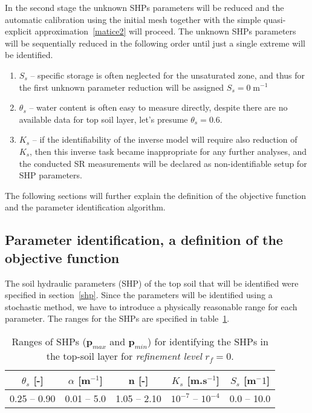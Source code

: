 \documentclass[review]{elsarticle}
\renewcommand{\vec}{\mathbf}
\begin{document}
In the second stage the unknown SHPs parameters will be reduced and the automatic calibration using the initial mesh together with the simple quasi-explicit approximation~\eqref{matice2} will proceed.
The unknown SHPs parameters will be sequentially reduced in the following order until just a single extreme will be identified.
\begin{enumerate}[label=({\bf \Roman*})]
\item $S_s$ -- specific storage is often neglected for the unsaturated zone, and thus for the first unknown parameter reduction will be assigned $S_s=0\;\mbox{m}^{-1}$
\item $\theta_s$ -- water content is often easy to measure directly, despite there are no available data for top soil layer, let's presume $\theta_s = 0.6.$
\item $K_s$ -- if the identifiability of the inverse model will require also reduction of $K_s$, then this inverse task became inappropriate for any further analyses, and the conducted SR measurements will be declared as non-identifiable setup for SHP parameters.
\end{enumerate}


The following sections will further explain the definition of the objective function and the parameter identification algorithm.



\subsection{Parameter identification, a definition of the objective function} %
\label{objdef}

The soil hydraulic parameters (SHP) of the top soil that will be identified were specified in section~\ref{shp}.
Since the parameters will be identified using a stochastic method, we have to introduce a physically reasonable range for each parameter. The ranges for the SHPs are specified in table~\ref{rozsahy}.

\begin{table}[ht]
\begin{center}
\caption{Ranges of SHPs ($\vec{p}_{max}$ and $\vec{p}_{min}$) for identifying the SHPs in the top-soil layer for {\it refinement level} $r_f=0$.}
\begin{small}
\doublespacing
\begin{tabular}{c c c c c}
\toprule
$\theta_s$ [-]&$\alpha$ [m$^{-1}$]&n [-]& $K_s$ [m.s$^{-1}$] & $S_s$ [m$^-1$] \\ \hline
\toprule
0.25 -- 0.90 & 0.01 -- 5.0 & 1.05 -- 2.10 & $10^{-7}$ -- $10^{-4}$ & 0.0 -- 10.0 \\
\toprule
\end{tabular}
\end{small}
\label{rozsahy}
\end{center}
\end{table}
\end{document}
